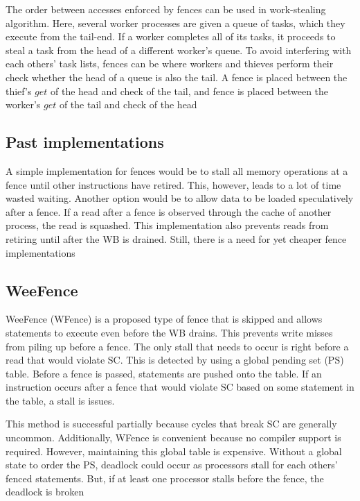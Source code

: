 \documentclass[twoside]{article}
\begin{document}
The order between accesses enforced by fences can be used in work-stealing algorithm. Here, several worker processes are given a queue of tasks, which they execute from the tail-end. If a worker completes all of its tasks, it proceeds to steal a task from the head of a different worker's queue. To avoid interfering with each others' task lists, fences can be where workers and thieves perform their check whether the head of a queue is also the tail. A fence is placed between the thief's $get$ of the head and check of the tail, and fence is placed between the worker's $get$ of the tail and check of the head

\subsection{Past implementations}

A simple implementation for fences would be to stall all memory operations at a fence until other instructions have retired. This, however, leads to a lot of time wasted waiting. Another option would be to allow data to be loaded speculatively after a fence. If a read after a fence is observed through the cache of another process, the read is squashed. This implementation also prevents reads from retiring until after the WB is drained. Still, there is a need for yet cheaper fence implementations

\subsection{WeeFence}

WeeFence (WFence) is a proposed type of fence that is skipped and allows statements to execute even before the WB drains. This prevents write misses from piling up before a fence. The only stall that needs to occur is right before a read that would violate SC. This is detected by using a global pending set (PS) table. Before a fence is passed, statements are pushed onto the table. If an instruction occurs after a fence that would violate SC based on some statement in the table, a stall is issues.

This method is successful partially because cycles that break SC are generally uncommon. Additionally, WFence is convenient because no compiler support is required. However, maintaining this global table is expensive. Without a global state to order the PS, deadlock could occur as processors stall for each others' fenced statements. But, if at least one processor stalls before the fence, the deadlock is broken
\end{document}
